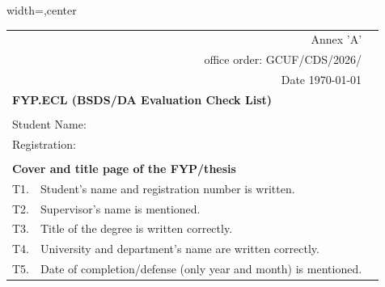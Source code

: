 \begin{table}[!ht]
\footnotesize
\begin{adjustbox}{width=\linewidth,center}
\begin{tabular}{p{0.6cm}p{9cm}p{0.6cm}}
               & \multicolumn{1}{r}{Annex 'A'}                                                                                   &  \\
               & \multicolumn{1}{r}{office order: GCUF/CDS/2026/}                                                             &  \\
               & \multicolumn{1}{r}{Date \today }                                                                &  \\
\multicolumn{2}{l}{\textbf{FYP.ECL (BSDS/DA    Evaluation Check List)}}                                                          &  \\
               &                                                                                                                 &  \\
\multicolumn{2}{l}{Student  Name:}                                                                                               &  \\
\multicolumn{2}{l}{Registration:}                                                                                                &  \\
               &                                                                                                                 &  \\
\multicolumn{2}{l}{\textbf{Cover and title   page of the FYP/thesis}}                                                                &  \\
T1.            & Student's name and registration   number is written.                                                            &  \\
T2.            & Supervisor's name is   mentioned.                                                                               &  \\
T3.            & Title of the degree   is written correctly.                                                                     &  \\
T4.            & University and   department's name are written correctly.                                                           &  \\
T5.            & Date of   completion/defense (only year and month) is mentioned.                                                &  \\

\end{tabular}
\end{adjustbox}
\end{table}
